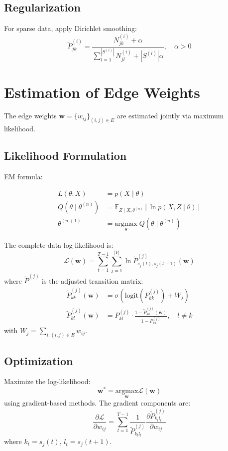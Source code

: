 \documentclass[answers,12pt,addpoints]{exam}
\begin{document}
\subsection{Regularization}
For sparse data, apply Dirichlet smoothing:
\begin{equation}
\tilde{P}^{(i)}_{jk} = \frac{N^{(i)}_{jk} + \alpha}{\sum_{l=1}^{|S^{(i)}|} N^{(i)}_{jl} + |S^{(i)}| \alpha}, \quad \alpha > 0
\end{equation}

\section{Estimation of Edge Weights}
The edge weights $\mathbf{w} = \{w_{ij}\}_{(i,j)\in E}$ are estimated jointly via maximum likelihood.

\subsection{Likelihood Formulation}
EM formula:

\[
\begin{aligned}
    L(\theta : X) &= p(X \mid \theta)\\
    Q(\theta \mid \theta^{(n)}) &= \mathbb{E}_{Z \mid X, \theta^{(n)}} \left[ \ln p(X, Z \mid \theta) \right] \\
    \theta^{(n+1)} &= \underset{\theta}{\mathrm{argmax}} \; Q(\theta \mid \theta^{(n)})
\end{aligned}
\]


The complete-data log-likelihood is:
\begin{equation}
\mathcal{L}(\mathbf{w}) = \sum_{t=1}^{T-1} \sum_{j=1}^{|V|} \ln \widetilde{P}^{(j)}_{s_j(t), s_j(t+1)}(\mathbf{w})
\end{equation}
where $\widetilde{P}^{(j)}$ is the adjusted transition matrix:
\begin{align*}
\widetilde{P}^{(j)}_{kk}(\mathbf{w}) &= \sigma\left( \mathrm{logit}(P^{(j)}_{kk}) + W_j \right) \\
\widetilde{P}^{(j)}_{kl}(\mathbf{w}) &= P^{(j)}_{kl} \cdot \frac{1 - \widetilde{P}^{(j)}_{kk}(\mathbf{w})}{1 - P^{(j)}_{kk}}, \quad l \neq k
\end{align*}
with $W_j = \sum_{i:(i,j)\in E} w_{ij}$.

\subsection{Optimization}
Maximize the log-likelihood:
\begin{equation}
\mathbf{w}^* = \underset{\mathbf{w}}{\mathrm{argmax}}  \mathcal{L}(\mathbf{w})
\end{equation}
using gradient-based methods. The gradient components are:
\begin{equation}
\frac{\partial \mathcal{L}}{\partial w_{ij}} = \sum_{t=1}^{T-1} \frac{1}{\widetilde{P}^{(j)}_{k_t l_t}} \frac{\partial \widetilde{P}^{(j)}_{k_t l_t}}{\partial w_{ij}}
\end{equation}
where $k_t = s_j(t)$, $l_t = s_j(t+1)$.
\end{document}
